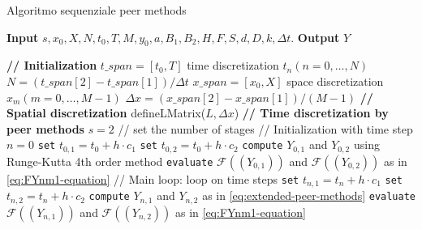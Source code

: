 \vspace{0.2cm}
\begin{breakablealgorithm}
    \caption{Algoritmo sequenziale peer methods}\label{alg:peerMethodsSequential}
    \vspace{0.5cm}
    \textbf{Input} $s,x_0,X,N, t_0, T,M, y_0, a,B_1,B_2,H, F, S, d, D, k, \Delta t$. \quad
    \textbf{Output} $Y$
    \vspace{0.2cm}
    \begin{algorithmic}[1]
        \Statex \textbf{// Initialization}
        \State $t\_span = [t_0, T]$
        \State time discretization $t_n(n = 0, \ldots, N)$
        \State $N = (t\_span[2]-t\_span[1])/\Delta t$
        \State $x\_span = [x_0, X]$
        \State space discretization $x_m(m = 0, \ldots, M - 1)$
        \State $\Delta x = (x\_span[2]-x\_span[1])/(M - 1)$
        \Statex \textbf{// Spatial discretization}
        \State defineLMatrix($L, \Delta x$)
        \Statex \textbf{// Time discretization by peer methods}
        \State $s = 2$ // set the number of stages
        \Statex // Initialization with time step $n = 0$
        \State \texttt{set} $t_{0,1} = t_0 + h \cdot c_1$
        \State \texttt{set} $t_{0,2} = t_0 + h \cdot c_2$
        \State \texttt{compute} $Y_{0,1}$ and $Y_{0,2}$ using Runge-Kutta 4th order method
        \State \texttt{evaluate} $\mathcal{F}((Y_{0,1}))$ and $\mathcal{F}((Y_{0,2}))$ as in \eqref{eq:FYnm1-equation}
        \Statex // Main loop: loop on time steps
        \State \texttt{set} $t_{n,1} = t_n + h \cdot c_1$
        \State \texttt{set} $t_{n,2} = t_n + h \cdot c_2$
        \State \texttt{compute} $Y_{n,1}$ and $Y_{n,2}$ as in \eqref{eq:extended-peer-methods}
        \State \texttt{evaluate} $\mathcal{F}((Y_{n,1}))$ and $\mathcal{F}((Y_{n,2}))$ as in \eqref{eq:FYnm1-equation}
        \EndFor
    \end{algorithmic}
\end{breakablealgorithm}
\vspace{0.2cm}
